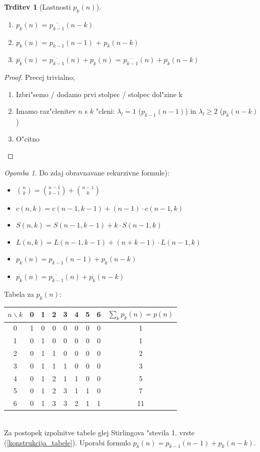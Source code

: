 \documentclass[a4paper,12pt]{article}
\theoremstyle{definition}
\newtheorem{claim}[counter]{Trditev}
\theoremstyle{remark}
\newtheorem*{rem}{Opomba}
\begin{document}
\begin{claim}[Lastnosti $p_k(n)$]\mbox{}
	\begin{enumerate}
	    \item $p_k(n)$ = $\overline{p_{k - 1}} (n - k)$
	    \item $p_k(n)$ = $p_{k - 1} (n - 1)$ + $p_k (n - k)$
	    \item $\overline{p_{k}}(n)$ = $\overline{p_{k - 1}}(n) + p_k (n)$ = $\overline{p_{k - 1}}(n) + \overline{p_k} (n - k)$
	\end{enumerate}
\end{claim}

\begin{proof}
	Precej trivialno;
    \begin{enumerate}
        \item Izbri"semo / dodamo prvi stolpec / stolpec dol"zine k
        \item Imamo raz"clenitev $n$ s $k$ "cleni: $\lambda_l = 1$ ($p_{k - 1}(n - 1)$) in $\lambda_l \geqslant 2$ ($p_k(n - k)$)
        \item O"citno
    \end{enumerate}
\end{proof}

\begin{rem}
	Do zdaj obravnavane rekurzivne formule):\\
	\begin{itemize}
	    \item $\binom{n}{k} = \binom{n - 1}{k - 1} + \binom{n - 1}{k}$
	    \item $c(n, k) = c(n - 1, k - 1) + (n - 1)\cdot c(n - 1, k)$
	    \item $S(n, k) = S(n - 1, k - 1) + k\cdot S(n - 1, k)$
	    \item $L(n, k) = L(n - 1, k - 1) + (n + k - 1)\cdot L(n - 1, k)$
	    \item $p_k(n) = p_{k - 1}(n - 1) + p_k (n - k)$
	    \item $\overline{p_k}(n) = \overline{p_{k - 1}}(n) + \overline{p_k}(n - k)$
	\end{itemize}
\end{rem}

Tabela za $p_k(n)$:
\begin{tabular}{c|c c c c c c c|c}
    $n \backslash k$ & 0 & 1 & 2 & 3 & 4 & 5 & 6 & $\sum_k p_k(n) = p(n)$\\
    \hline
    0 & 1 & 0 & 0 & 0 & 0 & 0 & 0 & 1 \\
    1 & 0 & 1 & 0 & 0 & 0 & 0 & 0 & 1 \\
    2 & 0 & 1 & 1 & 0 & 0 & 0 & 0 & 2 \\
    3 & 0 & 1 & 1 & 1 & 0 & 0 & 0 & 3 \\
    4 & 0 & 1 & 2 & 1 & 1 & 0 & 0 & 5 \\
    5 & 0 & 1 & 2 & 3 & 1 & 1 & 0 & 7 \\
    6 & 0 & 1 & 3 & 3 & 2 & 1 & 1 & 11 \\
\end{tabular}\\
Za postopek izpolnitve tabele glej Stirlingova "stevila 1. vrste (\ref{konstrukcija_tabele}). Uporabi formulo $p_k(n) = p_{k - 1}(n - 1) + p_k(n - k)$.
\end{document}
